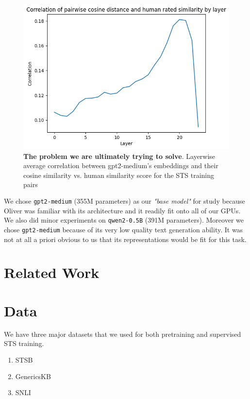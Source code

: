 \documentclass[14pt]{article}
\begin{document}
\begin{figure}[!htb]
    \centering
    \includegraphics[width=0.57\linewidth]{raw_cosine_sim.png}
    \caption{\textbf{The problem we are ultimately trying to solve}. Layerwise average correlation between gpt2-medium's embeddings and their cosine similarity vs. human similarity score for the STS training pairs}
    \label{fig:raw-corr}
\end{figure}
We chose \verb|gpt2-medium| (355M parameters) as our \textit{"base model"} for study because Oliver was familiar with its architecture and it readily fit onto all of our GPUs. We also did minor experiments on \verb|qwen2-0.5B| (391M parameters). Moreover we chose \verb|gpt2-medium| because of its very low quality text generation ability. It was not at all a priori obvious to us that its representations would be fit for this task.

\section{Related Work}

\section{Data}
We have three major datasets that we used for both pretraining and supervised STS training.
\begin{enumerate}
    \item STSB \cite{STS}
    \item GenericsKB \cite{bhakthavatsalam2020genericskbknowledgebasegeneric}
    \item SNLI \cite{snli}
\end{enumerate}
\end{document}
